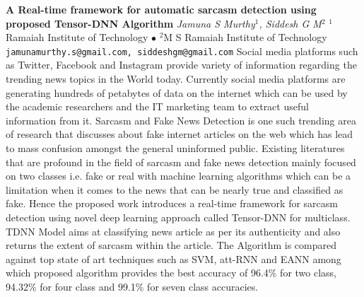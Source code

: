 
    \begin{conf-abstract}[]
        {\textbf{A Real-time framework for automatic sarcasm detection using proposed Tensor-DNN Algorithm}}
        {\textit{Jamuna S Murthy$^{1}$, Siddesh  G M$^{2}$}}
        {$^{1}$Ramaiah Institute of Technology $\bullet$ $^{2}$M S Ramaiah Institute of Technology}
        {\texttt{jamunamurthy.s@gmail.com, siddeshgm@gmail.com}}
        {Social media platforms such as Twitter, Facebook and Instagram provide variety of information regarding the trending news topics in the World today. Currently social media platforms are generating hundreds of petabytes of data on the internet which can be used by the academic researchers and the IT marketing team to extract useful information from it. Sarcasm and Fake News Detection is one such trending area of research that discusses about fake internet articles on the web which has lead to mass confusion amongst the general uninformed public. Existing literatures that are profound in the field of sarcasm and fake news detection mainly focused on two classes i.e. fake or real with machine learning algorithms which can be a limitation when it comes to the news that can be nearly true and classified as fake. Hence the proposed work introduces a real-time framework for sarcasm detection using novel deep learning approach called Tensor-DNN for multiclass.  TDNN Model aims at classifying news article as per its authenticity and also returns the extent of sarcasm within the article. The Algorithm is compared against top state of art techniques such as SVM, att-RNN and EANN among which proposed algorithm provides the best accuracy of 96.4\% for two class, 94.32\% for four class and 99.1\% for seven class accuracies. }
    \end{conf-abstract}
        